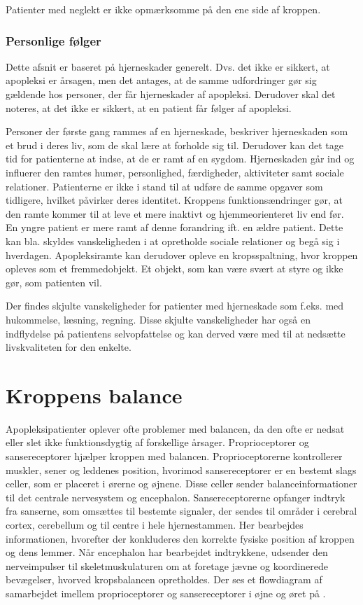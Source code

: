 Patienter med neglekt er ikke opmærksomme på den ene side af kroppen.
\subsection{Personlige følger}
Dette afsnit er baseret på hjerneskader generelt. Dvs. det ikke er sikkert, at apopleksi er årsagen, men det antages, at de samme udfordringer gør sig gældende hos personer, der får hjerneskader af apopleksi. Derudover skal det noteres, at det ikke er sikkert, at en patient får følger af apopleksi.

Personer der første gang rammes af en hjerneskade, beskriver hjerneskaden som et brud i deres liv, som de skal lære at forholde sig til. Derudover kan det tage tid for patienterne at indse, at de er ramt af en sygdom. Hjerneskaden går ind og influerer den ramtes humør, personlighed, færdigheder, aktiviteter samt sociale relationer. Patienterne er ikke i stand til at udføre de samme opgaver som tidligere, hvilket påvirker deres identitet. Kroppens funktionsændringer gør, at den ramte kommer til at leve et mere inaktivt og hjemmeorienteret liv end før. En yngre patient er mere ramt af denne forandring ift. en ældre patient. Dette kan bla. skyldes vanskeligheden i at opretholde sociale relationer og begå sig i hverdagen. Apopleksiramte kan derudover opleve en kropsspaltning, hvor kroppen opleves som et fremmedobjekt. Et objekt, som kan være svært at styre og ikke gør, som patienten vil. \cite{Sundhedsstyrelsen2010}

Der findes skjulte vanskeligheder for patienter med hjerneskade som f.eks. med hukommelse, læsning, regning. Disse skjulte vanskeligheder har også en indflydelse på patientens selvopfattelse og  kan derved være med til at nedsætte livskvaliteten for den enkelte. \cite{Sundhedsstyrelsen2010} 

\chapter{Kroppens balance}\label{app-Balance}
Apopleksipatienter oplever ofte problemer med balancen, da den ofte er nedsat eller slet ikke funktionsdygtig af forskellige årsager. \cite{Karnath2003} Proprioceptorer og sansereceptorer hjælper kroppen med balancen. Proprioceptorerne kontrollerer muskler, sener og leddenes position, hvorimod sansereceptorer er en bestemt slags celler, som er placeret i ørerne og øjnene. \cite{Martini2012} Disse celler sender balanceinformationer til det centrale nervesystem og encephalon. Sansereceptorerne opfanger indtryk fra sanserne, som omsættes til bestemte signaler, der sendes til områder i cerebral cortex, cerebellum og til centre i hele hjernestammen. Her bearbejdes informationen, hvorefter der konkluderes den korrekte fysiske position af kroppen og dens lemmer. Når encephalon har bearbejdet indtrykkene, udsender den nerveimpulser til skeletmuskulaturen om at foretage jævne og koordinerede bevægelser, hvorved kropsbalancen opretholdes.\cite{Martini2012} Der ses et flowdiagram af samarbejdet imellem proprioceptorer og sansereceptorer i øjne og øret på .


